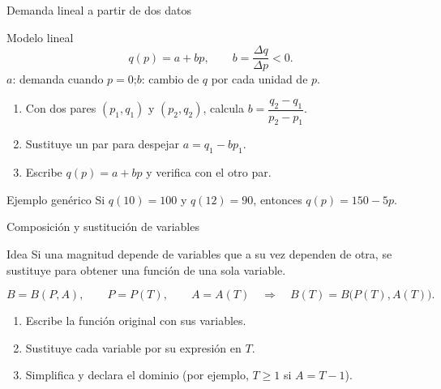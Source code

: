 \documentclass[aspectratio=169]{beamer}
\begin{document}
\begin{frame}{Demanda lineal a partir de dos datos}
  \small\vspace{-1pt}
  \begin{block}{Modelo lineal}
    \[
      q(p)=a+bp,\qquad b=\frac{\Delta q}{\Delta p}<0.
    \]
    \(a\): demanda cuando \(p=0\);\quad \(b\): cambio de \(q\) por cada unidad
    de \(p\).
  \end{block}
  \begin{mwpasos}
    \begin{enumerate}
      \item Con dos pares \((p_1,q_1)\) y \((p_2,q_2)\), calcula
            \(b=\dfrac{q_2-q_1}{p_2-p_1}\).
      \item Sustituye un par para despejar \(a=q_1-bp_1\).
      \item Escribe \(q(p)=a+bp\) y verifica con el otro par.
    \end{enumerate}
  \end{mwpasos}
  \begin{exampleblock}{Ejemplo genérico}
    Si \(q(10)=100\) y \(q(12)=90\), entonces \(q(p)=150-5p\).
  \end{exampleblock}
\end{frame}

\begin{frame}{Composición y sustitución de variables}
  \begin{block}{Idea}
    Si una magnitud depende de variables que a su vez dependen de otra, se
    sustituye para obtener una función de una sola variable.
  \end{block}
  \[
    B=B(P,A),\qquad P=P(T),\qquad A=A(T)
    \quad\Longrightarrow\quad
    B(T)=B\bigl(P(T),A(T)\bigr).
  \]
  \begin{mwpasos}
    \begin{enumerate}
      \item Escribe la función original con sus variables.
      \item Sustituye cada variable por su expresión en \(T\).
      \item Simplifica y declara el dominio (por ejemplo, \(T\ge 1\) si
            \(A=T-1\)).
    \end{enumerate}
  \end{mwpasos}
\end{frame}
\end{document}
